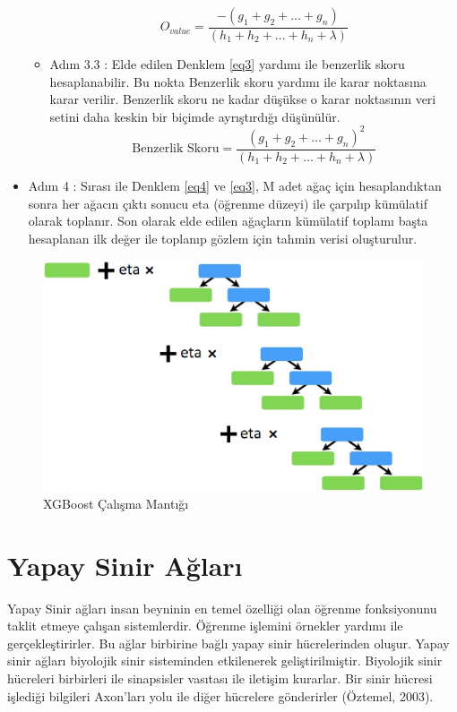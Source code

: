 \documentclass[12pt,twoside]{deuthesis}
\begin{document}
\begin{itemize}
\begin{itemize}
\[      \]
    \begin{equation}
      O_{value} = \frac{-(g_1 + g_2 + \ldots + g_n)}{(h_1 + h_2 + \ldots + h_n + \lambda)}
      \label{eq3}
      \end{equation}
  \item
    Adım 3.3 : Elde edilen Denklem \ref{eq3} yardımı ile benzerlik skoru hesaplanabilir. Bu nokta Benzerlik skoru yardımı ile karar noktasına karar verilir. Benzerlik skoru ne kadar düşükse o karar noktasının veri setini daha keskin bir biçimde ayrıştırdığı düşünülür.
    \begin{equation}
      \label{eq4}
      \textrm{Benzerlik Skoru} = \frac{(g_1 + g_2 + \ldots + g_n)^2}{(h_1 + h_2 + \ldots + h_n + \lambda)}
      \end{equation}
  \end{itemize}
\item
  Adım 4 : Sırası ile Denklem \ref{eq4} ve \ref{eq3}, M adet ağaç için hesaplandıktan sonra her ağacın çıktı sonucu eta (öğrenme düzeyi) ile çarpılıp kümülatif olarak toplanır. Son olarak elde edilen ağaçların kümülatif toplamı başta hesaplanan ilk değer ile toplanıp gözlem için tahmin verisi oluşturulur.
\end{itemize}
\begin{figure}

{\centering \includegraphics[width=0.8\linewidth,height=0.3\textheight]{figure/xgb} 

}

\caption{XGBoost Çalışma Mantığı}\label{fig:unnamed-chunk-9}
\end{figure}
\hypertarget{nn}{%
\section{Yapay Sinir Ağları}\label{nn}}

Yapay Sinir ağları insan beyninin en temel özelliği olan öğrenme fonksiyonunu taklit etmeye çalışan sistemlerdir. Öğrenme işlemini örnekler yardımı ile gerçekleştirirler. Bu ağlar birbirine bağlı yapay sinir hücrelerinden oluşur. Yapay sinir ağları biyolojik sinir sisteminden etkilenerek geliştirilmiştir. Biyolojik sinir hücreleri birbirleri ile sinapsisler vasıtası ile iletişim kurarlar. Bir sinir hücresi işlediği bilgileri Axon'ları yolu ile diğer hücrelere gönderirler (Öztemel, 2003).\\
\end{document}
